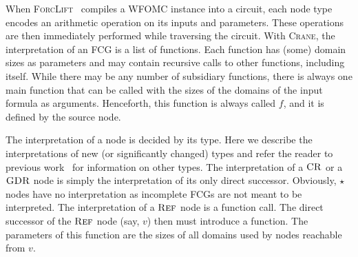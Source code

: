 \documentclass{article}
\theoremstyle{definition}
\theoremstyle{remark}
\DeclareMathOperator{\CR}{\textsc{CR}}
\DeclareMathOperator{\GDR}{\textsc{GDR}}
\DeclareMathOperator{\Reff}{\textsc{Ref}}
\begin{document}
When \textsc{ForcLift}~\cite{DBLP:conf/ijcai/BroeckTMDR11} compiles a WFOMC
instance into a circuit, each node type encodes an arithmetic operation on its
inputs and parameters. These operations are then immediately performed while
traversing the circuit. With \textsc{Crane}, the interpretation of an FCG is a
list of functions. Each function has (some) domain sizes as parameters and may
contain recursive calls to other functions, including itself. While there may be
any number of subsidiary functions, there is always one main function that can
be called with the sizes of the domains of the input formula as arguments.
Henceforth, this function is always called $f$, and it is defined by the source
node.

The interpretation of a node is decided by its type. Here we describe the
interpretations of new (or significantly changed) types and refer the reader to
previous work~\cite{DBLP:conf/ijcai/BroeckTMDR11} for information on other
types. The interpretation of a $\CR$ or a $\GDR$ node is simply the
interpretation of its only direct successor. Obviously, $\star$ nodes have no
interpretation as incomplete FCGs are not meant to be interpreted. The
interpretation of a $\Reff$ node is a function call. The direct successor of the
$\Reff$ node (say, $v$) then must introduce a function. The parameters of this
function are the sizes of all domains used by nodes reachable from $v$.
\end{document}
